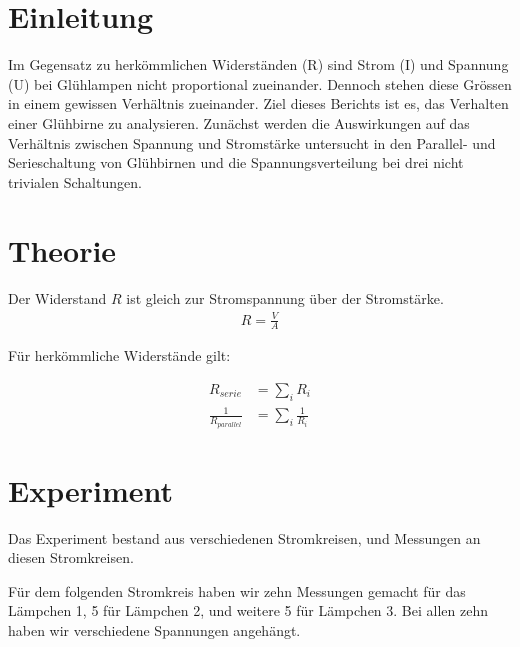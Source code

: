\documentclass[12pt, a4paper, twoside]{article}
\begin{document}
\maketitlepage

\section{Einleitung}
Im Gegensatz zu herkömmlichen Widerständen (R) sind Strom (I) und Spannung (U) bei Glühlampen nicht proportional zueinander. Dennoch stehen diese Grössen in einem gewissen Verhältnis zueinander. Ziel dieses Berichts ist es, das Verhalten einer Glühbirne zu analysieren. Zunächst werden die Auswirkungen auf das Verhältnis zwischen Spannung und Stromstärke untersucht in den Parallel- und Serieschaltung von Glühbirnen und die Spannungsverteilung bei drei nicht trivialen Schaltungen.


\section{Theorie}
Der Widerstand $R$ ist gleich zur Stromspannung über der Stromstärke.
\begin{align*}
  R = \frac{V}{A}
\end{align*}

Für herkömmliche Widerstände gilt:

\begin{align*}
  R_{serie}              & = \sum_{i}R_i            \\
  \frac{1}{R_{parallel}} & = \sum_{i} \frac{1}{R_i}
\end{align*}
\cite{FoTa, S.176}

\section{Experiment}
Das Experiment bestand aus verschiedenen Stromkreisen, und Messungen an diesen Stromkreisen.
\par
Für dem folgenden Stromkreis haben wir zehn Messungen gemacht für das Lämpchen 1, 5 für Lämpchen 2, und weitere 5 für Lämpchen 3.
Bei allen zehn haben wir verschiedene Spannungen angehängt.\\


\end{document}

